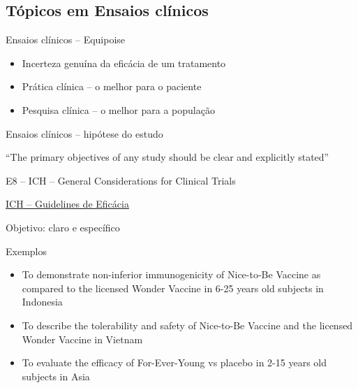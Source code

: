 \documentclass{beamer}
\begin{document}

\subsection{Tópicos em Ensaios clínicos}

\begin{frame}{Ensaios clínicos -- Equipoise}
  \begin{itemize}
    \small
  \item Incerteza genuína da eficácia de um tratamento
    \bigskip
  \item Prática clínica -- o melhor para o paciente
    \bigskip
  \item Pesquisa clínica -- o melhor para a população
  \end{itemize}
\end{frame}

\begin{frame}{Ensaios clínicos -- hipótese do estudo}

  \begin{block}{}
    ``The primary objectives of any study should be clear and explicitly stated''

    \bigskip
    \vfill
    \scriptsize
    \hfill E8 -- ICH -- General Considerations for Clinical Trials
  \end{block}
  \vfill
  \tiny
  \begin{center}
    \href{https://www.ich.org/products/guidelines/efficacy/article/efficacy-guidelines.html}{ICH -- Guidelines de Eficácia}
  \end{center}
\end{frame}

\begin{frame}{Objetivo: claro e específico}
  \begin{exampleblock}{Exemplos}
    \begin{itemize}
      \scriptsize
    \item To demonstrate non-inferior immunogenicity of Nice-to-Be Vaccine as compared to the licensed Wonder Vaccine in 6-25 years old subjects in Indonesia
      \bigskip
    \item To describe the tolerability and safety of Nice-to-Be Vaccine and the licensed Wonder Vaccine in Vietnam
      \bigskip
    \item To evaluate the efficacy of For-Ever-Young vs placebo in 2-15 years old subjects in Asia
    \end{itemize}
  \end{exampleblock}
\end{frame}
\end{document}
